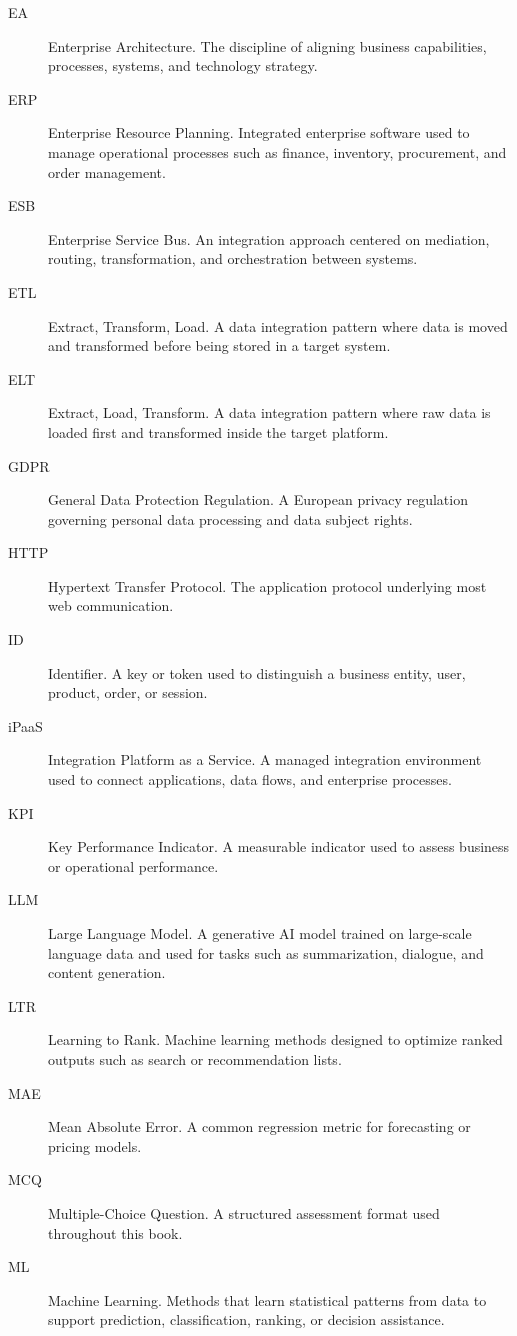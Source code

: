 \begin{description}
  \item[EA] Enterprise Architecture. The discipline of aligning business capabilities, processes, systems, and technology strategy.
  \item[ERP] Enterprise Resource Planning. Integrated enterprise software used to manage operational processes such as finance, inventory, procurement, and order management.
  \item[ESB] Enterprise Service Bus. An integration approach centered on mediation, routing, transformation, and orchestration between systems.
  \item[ETL] Extract, Transform, Load. A data integration pattern where data is moved and transformed before being stored in a target system.
  \item[ELT] Extract, Load, Transform. A data integration pattern where raw data is loaded first and transformed inside the target platform.
  \item[GDPR] General Data Protection Regulation. A European privacy regulation governing personal data processing and data subject rights.
  \item[HTTP] Hypertext Transfer Protocol. The application protocol underlying most web communication.
  \item[ID] Identifier. A key or token used to distinguish a business entity, user, product, order, or session.
  \item[iPaaS] Integration Platform as a Service. A managed integration environment used to connect applications, data flows, and enterprise processes.
  \item[KPI] Key Performance Indicator. A measurable indicator used to assess business or operational performance.
  \item[LLM] Large Language Model. A generative AI model trained on large-scale language data and used for tasks such as summarization, dialogue, and content generation.
  \item[LTR] Learning to Rank. Machine learning methods designed to optimize ranked outputs such as search or recommendation lists.
  \item[MAE] Mean Absolute Error. A common regression metric for forecasting or pricing models.
  \item[MCQ] Multiple-Choice Question. A structured assessment format used throughout this book.
  \item[ML] Machine Learning. Methods that learn statistical patterns from data to support prediction, classification, ranking, or decision assistance.

\end{description}
